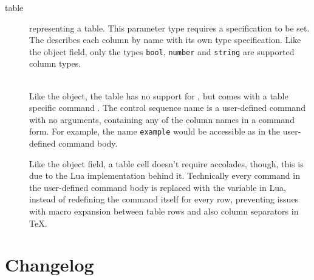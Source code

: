 \documentclass{ltxdoc}
\newcommand\showexample[5][15pt]{%
\begin{minipage}[t]{.5\linewidth - .5 \columnsep}%

\end{minipage}\hspace*{\columnsep}%
\begin{minipage}[t]{.5\linewidth - .5 \columnsep}%

\end{minipage}\\%
}
\begin{document}
\begin{description}
        \item[table] representing a table.
        This parameter type requires a  specification to be set.
        The  describes each column by name with its own type specification.
        Like the object field, only the types \texttt{bool}, \texttt{number} and \texttt{string} are supported column types.\\
        \showexample[20pt]{28}{28-36}{11}{11-15}
        \DescribeMacro{\fortablerow}
        Like the object, the table has no support for \cmd{\param}, but comes with a table specific command \cmd{\fortablerow}.
        The control sequence name  is a user-defined command with no arguments, containing any of the column names in a command form.
        For example, the name \texttt{example} would be accessible as \cmd{\example} in the user-defined command body.

        Like the object field, a table cell doesn't require accolades, though, this is due to the Lua implementation behind it.
        Technically every command in the user-defined command body is replaced with the variable in Lua, instead of redefining the command itself for every row, preventing issues with macro expansion between table rows and also column separators in \TeX{}.

    \end{description}

    \clearpage

    \printbibliography[heading=bibnumbered]

    \clearpage

    \section{Changelog}
    \newcommand\commitline[3]{\item #1\ifx&#3&%
    \else\\[1em]
    #3\fi\\\hspace*{1em} — \printdate{#2}}
    \newcommand\formatversion[3]{%
        \item[#1]
        \gittag[(taggerdate)(taggerdate:short)(authordate:short)]{printdate}{#1}
        \begin{itemize}
            \forgitcommit[s,as,b]{commitline}{#3}
        \end{itemize}
    }%
    \begin{description}
    \end{description}
\end{document}

